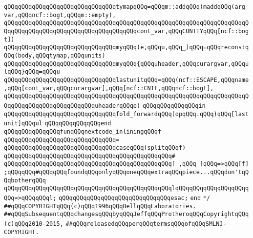 \verb|qQQqqQQqqQQqqQQqqQQqqQQqqQQqqQQqtymapqQQq=qQQqm::addqQQq(maddqQQq(arg_var,qQQqncf::bogt,qQQqm::empty),|\newline
\verb|qQQqqQQqqQQqqQQqqQQqqQQqqQQqqQQqqQQqqQQqqQQqqQQqqQQqqQQqqQQqqQQqqQQqqQQqqQQqqQQqqQQqqQQqqQQqqQQqqQQqqQQqqQQqcont_var,qQQqCONTTYqQQq[ncf::bogt])|\newline
\verb|qQQqqQQqqQQqqQQqqQQqqQQqqQQqqQQqmyqQQq(e,qQQqu,qQQq_)qQQq=qQQqreconstqQQq(body,qQQqtymap,qQQqunits)|\newline
\verb|qQQqqQQqqQQqqQQqqQQqqQQqqQQqqQQqmyqQQq{qQQquheader,qQQqcurargvar,qQQqulqQQq}qQQq=qQQqu|\newline
\verb|qQQqqQQqqQQqqQQqqQQqqQQqqQQqqQQqlastunitqQQq=qQQq(ncf::ESCAPE,qQQqname,qQQq[cont_var,qQQqcurargvar],qQQq[ncf::CNTt,qQQqncf::bogt],|\newline
\verb|qQQqqQQqqQQqqQQqqQQqqQQqqQQqqQQqqQQqqQQqqQQqqQQqqQQqqQQqqQQqqQQqqQQqqQQqqQQqqQQqqQQqqQQqqQQqqQQquheaderqQQqe)|\newline
\verb|qQQqqQQqqQQqqQQqin|\newline
\verb|qQQqqQQqqQQqqQQqqQQqqQQqqQQqqQQqfold_forwardqQQq(opqQQq.qQQq)qQQq[lastunit]qQQqul|\newline
\verb|qQQqqQQqqQQqqQQqend|\newline
\newline
\verb|qQQqqQQqqQQqqQQqfunqQQqnextcode_inliningqQQqf|\newline
\verb|qQQqqQQqqQQqqQQqqQQqqQQqqQQqqQQq=|\newline
\verb|qQQqqQQqqQQqqQQqqQQqqQQqqQQqqQQqcaseqQQq(splitqQQqf)|\newline
\verb|qQQqqQQqqQQqqQQqqQQqqQQqqQQqqQQqqQQqqQQqqQQqqQQq#|\newline
\verb|qQQqqQQqqQQqqQQqqQQqqQQqqQQqqQQqqQQqqQQqqQQqqQQq[_,qQQq_]qQQq=>qQQq[f];qQQqqQQq#qQQqqQQqfoundqQQqonlyqQQqoneqQQqextraqQQqpiece...qQQqdon'tqQQqbotherqQQq|\newline
\verb|qQQqqQQqqQQqqQQqqQQqqQQqqQQqqQQqqQQqqQQqqQQqqQQqlqQQqqQQqqQQqqQQqqQQqqQQq=>qQQqqQQql;|\newline
\verb|qQQqqQQqqQQqqQQqqQQqqQQqqQQqqQQqesac;|\newline
\verb|end|\newline
\verb|*/|\newline
\newline
\newline
\verb|##qQQqCOPYRIGHTqQQq(c)qQQq1996qQQqBellqQQqLaboratories.|\newline
\verb|##qQQqSubsequentqQQqchangesqQQqbyqQQqJeffqQQqProtheroqQQqCopyrightqQQq(c)qQQq2010-2015,|\newline
\verb|##qQQqreleasedqQQqperqQQqtermsqQQqofqQQqSMLNJ-COPYRIGHT.|\newline

